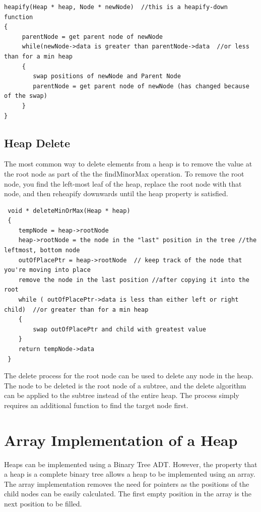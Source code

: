 \begin{lstlisting}
heapify(Heap * heap, Node * newNode)  //this is a heapify-down function
{
     parentNode = get parent node of newNode
     while(newNode->data is greater than parentNode->data  //or less than for a min heap
     {
     	swap positions of newNode and Parent Node
     	parentNode = get parent node of newNode (has changed because of the swap)
     }
}
 \end{lstlisting}
 
\subsection{Heap Delete}
 
 The most common way to delete elements from a heap is to remove the value at the root node as part of the the findMinorMax operation.
 To remove the root node,  you find the left-most leaf of the heap,  replace the root node with that node, and then reheapify downwards until the heap property is satisfied.
 
 \begin{lstlisting}
 void * deleteMinOrMax(Heap * heap)
 {
 	tempNode = heap->rootNode
 	heap->rootNode = the node in the "last" position in the tree //the leftmost, bottom node
 	outOfPlacePtr = heap->rootNode  // keep track of the node that you're moving into place
 	remove the node in the last position //after copying it into the root
 	while ( outOfPlacePtr->data is less than either left or right child)  //or greater than for a min heap
 	{
 		swap outOfPlacePtr and child with greatest value
 	}
 	return tempNode->data
 }
 \end{lstlisting}
 
 The delete process for the root node can be used to delete any node in the heap.   The node to be deleted is the root node of a subtree,  and the delete algorithm can be applied to the subtree instead of the entire heap.  The process simply requires an additional function to find the target node first.
 
\section{Array Implementation of a Heap}

Heaps can be implemented using a Binary Tree ADT.  However,  the property that a heap is a complete binary tree allows a heap to be implemented using an array.  The array implementation removes the need for pointers as the positions of the child nodes can be easily calculated.   The first empty position in the array is the next position to be filled.

